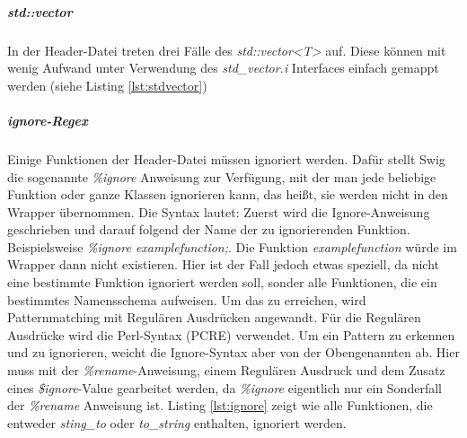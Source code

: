 \begin{code}[caption={std::map},label={lst:stdmap}, escapechar=|]

	

\end{code}

\subparagraph{std::vector}

In der Header-Datei treten drei Fälle des \emph{std::vector<T>} auf. Diese können mit wenig Aufwand unter Verwendung des \emph{std\_vector.i} Interfaces einfach gemappt werden (siehe Listing \ref{lst:stdvector})

\begin{code}[caption={std::vector},label={lst:stdvector}, escapechar=|]

\end{code}

\subparagraph{ignore-Regex}
Einige Funktionen der Header-Datei müssen ignoriert werden. Dafür stellt Swig die sogenannte \emph{\%ignore} Anweisung zur Verfügung, mit der man jede beliebige Funktion oder ganze Klassen ignorieren kann, das heißt, sie werden nicht in den Wrapper übernommen. Die Syntax lautet: Zuerst wird die Ignore-Anweisung geschrieben und darauf folgend der Name der zu ignorierenden Funktion. Beispielsweise \emph{\%ignore examplefunction;}. Die Funktion \emph{examplefunction} würde im Wrapper dann nicht existieren. Hier ist der Fall jedoch etwas speziell, da nicht eine bestimmte Funktion ignoriert werden soll, sonder alle Funktionen, die ein bestimmtes Namensschema aufweisen. Um das zu erreichen, wird Patternmatching mit Regulären Ausdrücken angewandt. Für die Regulären Ausdrücke wird die Perl-Syntax (PCRE) verwendet. Um ein Pattern zu erkennen und zu ignorieren, weicht die Ignore-Syntax aber von der Obengenannten ab. Hier muss mit der \emph{\%rename}-Anweisung, einem Regulären Ausdruck und dem Zusatz eines \emph{\$ignore}-Value gearbeitet werden, da \emph{\%ignore} eigentlich nur ein Sonderfall der \emph{\%rename} Anweisung ist.
Listing \ref{lst:ignore} zeigt wie alle Funktionen, die entweder \emph{sting\_to} oder \emph{to\_string} enthalten, ignoriert werden.

